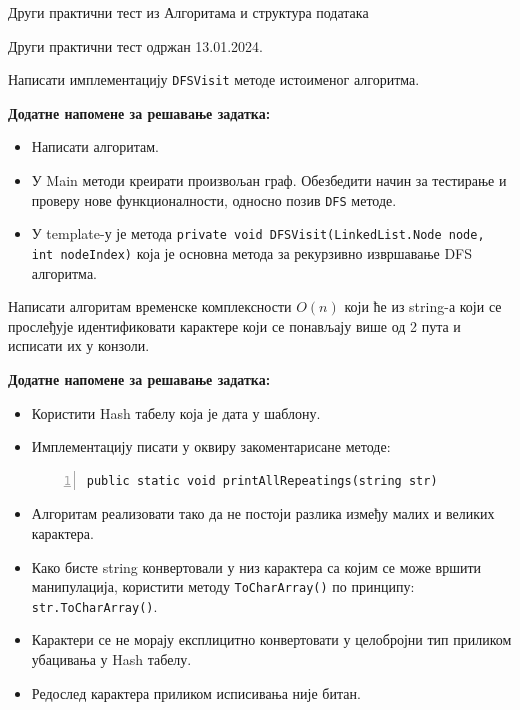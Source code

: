 
Други практични тест из Алгоритама и структура података

Други практични тест одржан 13.01.2024.

Написати имплементацију \texttt{DFSVisit} методе истоименог алгоритма.

\textbf{Додатне напомене за решавање задатка:}
\begin{itemize}
	\item Написати алгоритам.
	\item У Main методи креирати произвољан граф. Обезбедити начин за тестирање и проверу нове функционалности, односно позив \texttt{DFS} методе.
	\item У template-у је метода \texttt{private void DFSVisit(LinkedList.Node node, int nodeIndex)} која је основна метода за рекурзивно извршавање DFS алгоритма.
\end{itemize}



Написати алгоритам временске комплексности \(O(n)\) који ће из string-а који се прослеђује идентификовати карактере који се понављају више од 2 пута и исписати их у конзоли.

\textbf{Додатне напомене за решавање задатка:}
\begin{itemize}
	\item Користити Hash табелу која је дата у шаблону.
	\item Имплементацију писати у оквиру закоментарисане методе:
	\begin{Verbatim}[fontsize=\footnotesize, numbers=left, xleftmargin=10mm]
public static void printAllRepeatings(string str)
	\end{Verbatim}
	\item Алгоритам реализовати тако да не постоји разлика између малих и великих карактера.
	\item Како бисте string конвертовали у низ карактера са којим се може вршити манипулација, користити методу \texttt{ToCharArray()} по принципу: \texttt{str.ToCharArray()}.
	\item Карактери се не морају експлицитно конвертовати у целобројни тип приликом убацивања у Hash табелу.
	\item Редослед карактера приликом исписивања није битан.
\end{itemize}

